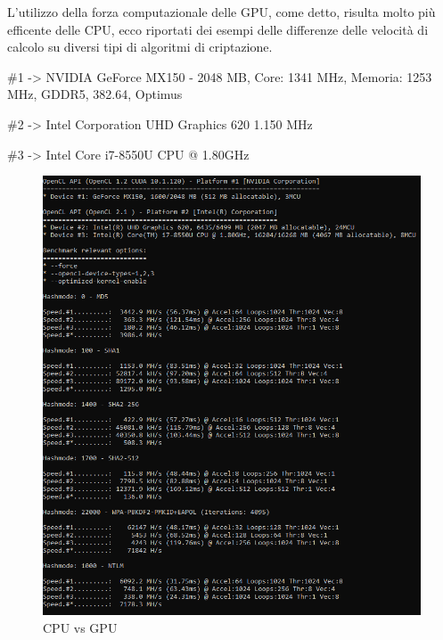 \newpage

L'utilizzo della forza computazionale delle GPU, come detto, risulta molto più efficente delle CPU, ecco riportati dei esempi delle differenze delle velocità di calcolo su diversi tipi di algoritmi di criptazione.
\newline

\#1 -> NVIDIA GeForce MX150 - 2048 MB, Core: 1341 MHz, Memoria: 1253 MHz, GDDR5, 382.64, Optimus

\#2 -> Intel Corporation UHD Graphics 620 1.150 MHz

\#3 -> Intel Core i7-8550U CPU @ 1.80GHz

\begin{figure}[ht]
    \centering
    \includegraphics[width=\linewidth]{Immagini/7/cpu_gpu.PNG}
    \caption{CPU vs GPU}
    \label{fig:CPU vs GPU}
\end{figure}

\label{chap:conc}